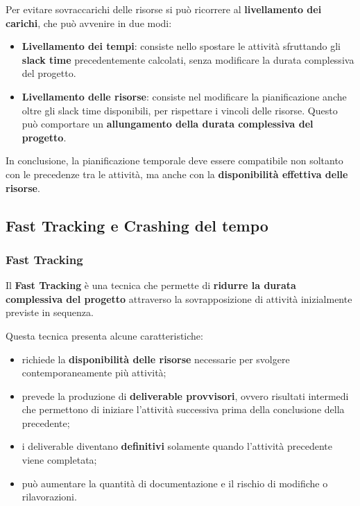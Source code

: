 \noindent Per evitare sovraccarichi delle risorse
si può ricorrere al \textbf{livellamento dei carichi},
che può avvenire in due modi:

\begin{itemize}
    \item \textbf{Livellamento dei tempi}:
    consiste nello spostare le attività sfruttando
    gli \textbf{slack time} precedentemente calcolati,
    senza modificare la durata complessiva del progetto.

    \item \textbf{Livellamento delle risorse}:
    consiste nel modificare la pianificazione
    anche oltre gli slack time disponibili,
    per rispettare i vincoli delle risorse.
    Questo può comportare un
    \textbf{allungamento della durata complessiva del progetto}.
\end{itemize}

\noindent In conclusione, la pianificazione temporale
deve essere compatibile non soltanto con le precedenze
tra le attività, ma anche con la
\textbf{disponibilità effettiva delle risorse}.
\subsection{Fast Tracking e Crashing del tempo}

\subsubsection*{Fast Tracking}

\noindent Il \textbf{Fast Tracking} è una tecnica che permette di
\textbf{ridurre la durata complessiva del progetto} attraverso
la sovrapposizione di attività inizialmente previste in sequenza.

\medskip

\noindent Questa tecnica presenta alcune caratteristiche:

\begin{itemize}
    \item richiede la \textbf{disponibilità delle risorse}
    necessarie per svolgere contemporaneamente più attività;

    \item prevede la produzione di \textbf{deliverable provvisori},
    ovvero risultati intermedi che permettono di iniziare
    l'attività successiva prima della conclusione della precedente;

    \item i deliverable diventano \textbf{definitivi} solamente
    quando l'attività precedente viene completata;

    \item può aumentare la quantità di documentazione e
    il rischio di modifiche o rilavorazioni.
\end{itemize}

